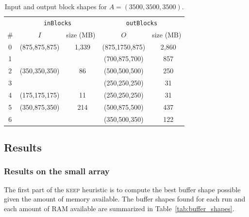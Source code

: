 \documentclass[sigconf, nonacm]{acmart}
\newcommand{\keep}[0]{\textsc{keep}\xspace}
\begin{document}
\begin{table}[ht]
  \centering
  \caption{Input and output block shapes for $A=(3500,3500,3500)$.}
   \begin{tabular}{c|cc|cc}
   \rowcolor{black!25}
          & \multicolumn{2}{c|}{\texttt{inBlocks}} & \multicolumn{2}{c}{\texttt{outBlocks}} \\
    \rowcolor{black!25}
     \#     & $I$ & size (MB) & $O$ & size (MB)  \\
   \hline
   0 & (875,875,875) & ~1,339 & (875,1750,875) & ~2,860 \\
   1 &               &     & (700,875,700)  & ~857 \\
   \rowcolor{black!10}
   2 & (350,350,350) & ~86  & (500,500,500)  & ~250 \\
   \rowcolor{black!10}
   3 &               &     & (250,250,250)  & ~31  \\
   4 & (175,175,175) &  ~11  & (250,250,250)  & ~31 \\
   \rowcolor{black!10}
   5 & (350,875,350) & ~214 & (500,875,500)  & ~437 \\
   \rowcolor{black!10}
   6 &               &     & (350,500,350)  & ~122 \\
   \end{tabular}
   \label{tab:exp}
\end{table}

\subsection{Results}

\subsubsection{Results on the small array}

The first part of the \keep heuristic is to compute the best buffer shape possible
given the amount of memory available.
The buffer shapes found for each run and each amount of RAM available are summarized in
Table~\ref{tab:buffer_shapes}.
\end{document}
